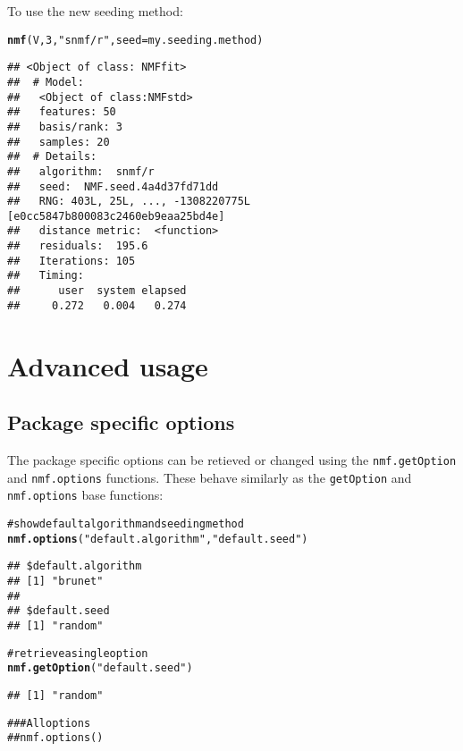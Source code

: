 \documentclass[a4paper]{article}\usepackage{graphicx, color}
\makeatletter
\newcommand{\hlfunctioncall}[1]{\textcolor[rgb]{0.501960784313725,0,0.329411764705882}{\textbf{#1}}}%
\newcommand{\hlstring}[1]{\textcolor[rgb]{0.6,0.6,1}{#1}}%
\newcommand{\hlcomment}[1]{\textcolor[rgb]{0.180392156862745,0.6,0.341176470588235}{#1}}%
\newenvironment{kframe}{%
 \def\at@end@of@kframe{}%
 \ifinner\ifhmode%
  \def\at@end@of@kframe{\end{minipage}}%
  \begin{minipage}{\columnwidth}%
 \fi\fi%
 \def\FrameCommand##1{\hskip\@totalleftmargin \hskip-\fboxsep
 \colorbox{shadecolor}{##1}\hskip-\fboxsep
     \hskip-\linewidth \hskip-\@totalleftmargin \hskip\columnwidth}%
 \MakeFramed {\advance\hsize-\width
   \@totalleftmargin\z@ \linewidth\hsize
   \@setminipage}}%
 {\par\unskip\endMakeFramed%
 \at@end@of@kframe}
\newenvironment{knitrout}{}{} %
\let\code=\texttt
\makeatother
\begin{document}
To use the new seeding method:
\begin{knitrout}
\color{fgcolor}\begin{kframe}
\begin{alltt}
\hlfunctioncall{nmf}(V, 3, \hlstring{"snmf/r"}, seed = my.seeding.method)
\end{alltt}
\begin{verbatim}
## <Object of class: NMFfit>
##  # Model:
##   <Object of class:NMFstd>
##   features: 50 
##   basis/rank: 3 
##   samples: 20 
##  # Details:
##   algorithm:  snmf/r 
##   seed:  NMF.seed.4a4d37fd71dd 
##   RNG: 403L, 25L, ..., -1308220775L [e0cc5847b800083c2460eb9eaa25bd4e]
##   distance metric:  <function> 
##   residuals:  195.6 
##   Iterations: 105 
##   Timing:
##      user  system elapsed 
##     0.272   0.004   0.274
\end{verbatim}
\end{kframe}
\end{knitrout}


\section{Advanced usage}

\subsection{Package specific options}
The package specific options can be retieved or changed using the \code{nmf.getOption} and \code{nmf.options} functions. 
These behave similarly as the \code{getOption} and \code{nmf.options} base functions:

\begin{knitrout}
\color{fgcolor}\begin{kframe}
\begin{alltt}
\hlcomment{# show default algorithm and seeding method}
\hlfunctioncall{nmf.options}(\hlstring{"default.algorithm"}, \hlstring{"default.seed"})
\end{alltt}
\begin{verbatim}
## $default.algorithm
## [1] "brunet"
## 
## $default.seed
## [1] "random"
\end{verbatim}
\begin{alltt}

\hlcomment{# retrieve a single option}
\hlfunctioncall{nmf.getOption}(\hlstring{"default.seed"})
\end{alltt}
\begin{verbatim}
## [1] "random"
\end{verbatim}
\begin{alltt}

\hlcomment{## # All options}
\hlcomment{## nmf.options()}
\end{alltt}
\end{kframe}
\end{knitrout}
\end{document}
